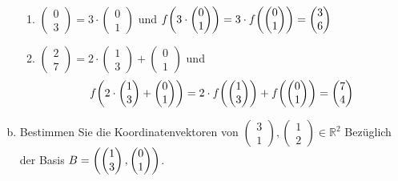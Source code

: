 \documentclass{scrreprt}
\begin{document}
\begin{enumerate}[(a)]
\begin{enumerate}[(1)]
  \item $\begin{pmatrix} 0 \\ 3 \end{pmatrix}
    = 3 \cdot \begin{pmatrix} 0 \\ 1 \end{pmatrix}$ und
    $f\qty(3 \cdot \begin{pmatrix} 0 \\ 1 \end{pmatrix})
    = 3 \cdot f\qty(\begin{pmatrix} 0 \\ 1 \end{pmatrix})
    = \begin{pmatrix} 3 \\ 6 \end{pmatrix}$

  \item $\begin{pmatrix} 2 \\ 7 \end{pmatrix}
    = 2 \cdot \begin{pmatrix} 1 \\ 3 \end{pmatrix}
    + \begin{pmatrix} 0 \\ 1 \end{pmatrix}$ und
    \[
      f\qty(2 \cdot \begin{pmatrix} 1 \\ 3 \end{pmatrix} +
        \begin{pmatrix} 0 \\ 1 \end{pmatrix})
      = 2 \cdot f\qty(\begin{pmatrix} 1 \\ 3 \end{pmatrix}) +
        f\qty(\begin{pmatrix} 0 \\ 1 \end{pmatrix})
      = \begin{pmatrix} 7 \\ 4 \end{pmatrix}
    \]
  \end{enumerate}
\item Bestimmen Sie die Koordinatenvektoren von
  $\begin{pmatrix} 3 \\ 1 \end{pmatrix}, \begin{pmatrix} 1 \\ 2 \end{pmatrix}
  \in \mathbb{R}^2$ Bezüglich der Basis
  $B = \qty(
    \begin{pmatrix} 1 \\ 3 \end{pmatrix},
    \begin{pmatrix} 0 \\ 1 \end{pmatrix}
  )$.


\end{enumerate}
\end{document}
